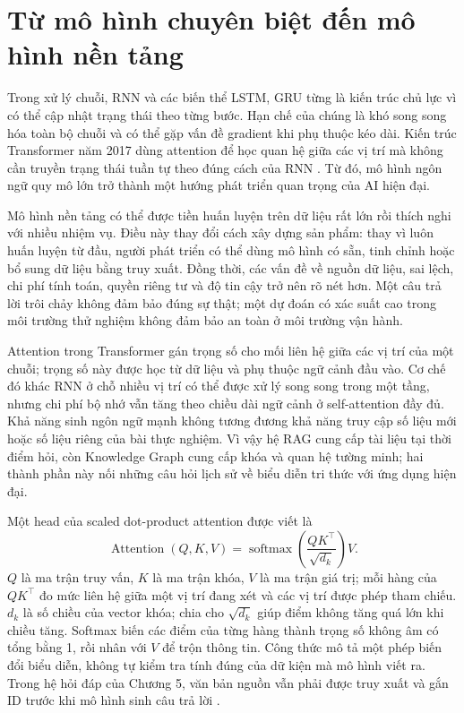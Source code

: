 \documentclass[12pt,a4paper]{report}
\begin{document}
\section{Từ mô hình chuyên biệt đến mô hình nền tảng}
Trong xử lý chuỗi, RNN và các biến thể LSTM, GRU từng là kiến trúc chủ lực vì có thể cập nhật trạng thái theo từng bước. Hạn chế của chúng là khó song song hóa toàn bộ chuỗi và có thể gặp vấn đề gradient khi phụ thuộc kéo dài. Kiến trúc Transformer năm 2017 dùng attention để học quan hệ giữa các vị trí mà không cần truyền trạng thái tuần tự theo đúng cách của RNN \cite{transformer2017}. Từ đó, mô hình ngôn ngữ quy mô lớn trở thành một hướng phát triển quan trọng của AI hiện đại.

Mô hình nền tảng có thể được tiền huấn luyện trên dữ liệu rất lớn rồi thích nghi với nhiều nhiệm vụ. Điều này thay đổi cách xây dựng sản phẩm: thay vì luôn huấn luyện từ đầu, người phát triển có thể dùng mô hình có sẵn, tinh chỉnh hoặc bổ sung dữ liệu bằng truy xuất. Đồng thời, các vấn đề về nguồn dữ liệu, sai lệch, chi phí tính toán, quyền riêng tư và độ tin cậy trở nên rõ nét hơn. Một câu trả lời trôi chảy không đảm bảo đúng sự thật; một dự đoán có xác suất cao trong môi trường thử nghiệm không đảm bảo an toàn ở môi trường vận hành.

Attention trong Transformer gán trọng số cho mối liên hệ giữa các vị trí của một chuỗi; trọng số này được học từ dữ liệu và phụ thuộc ngữ cảnh đầu vào. Cơ chế đó khác RNN ở chỗ nhiều vị trí có thể được xử lý song song trong một tầng, nhưng chi phí bộ nhớ vẫn tăng theo chiều dài ngữ cảnh ở self-attention đầy đủ. Khả năng sinh ngôn ngữ mạnh không tương đương khả năng truy cập số liệu mới hoặc số liệu riêng của bài thực nghiệm. Vì vậy hệ RAG cung cấp tài liệu tại thời điểm hỏi, còn Knowledge Graph cung cấp khóa và quan hệ tường minh; hai thành phần này nối những câu hỏi lịch sử về biểu diễn tri thức với ứng dụng hiện đại.

Một head của scaled dot-product attention được viết là
\begin{equation}
\operatorname{Attention}(Q,K,V)=\operatorname{softmax}\!\left(\frac{QK^\top}{\sqrt{d_k}}\right)V.
\end{equation}
$Q$ là ma trận truy vấn, $K$ là ma trận khóa, $V$ là ma trận giá trị; mỗi hàng của $QK^\top$ đo mức liên hệ giữa một vị trí đang xét và các vị trí được phép tham chiếu. $d_k$ là số chiều của vector khóa; chia cho $\sqrt{d_k}$ giúp điểm không tăng quá lớn khi chiều tăng. Softmax biến các điểm của từng hàng thành trọng số không âm có tổng bằng 1, rồi nhân với $V$ để trộn thông tin. Công thức mô tả một phép biến đổi biểu diễn, không tự kiểm tra tính đúng của dữ kiện mà mô hình viết ra. Trong hệ hỏi đáp của Chương 5, văn bản nguồn vẫn phải được truy xuất và gắn ID trước khi mô hình sinh câu trả lời \cite{transformer2017,essay03-lewis}.
\end{document}

